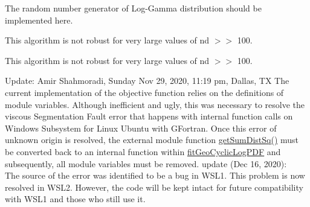 
\begin{DoxyRefList}
\item[Subprogram \mbox{\hyperlink{namespaceDistUniLogGamma__mod_acc6e60c6fa66c784f1f801eb419ecbff}{Dist\+Uni\+Log\+Gamma\+\_\+mod\+::rand}} (self)]\label{todo__todo000001}%
%
 The random number generator of Log-\/\+Gamma distribution should be implemented here.  
\item[Subprogram \mbox{\hyperlink{namespaceDomainEllipsoid__mod_a72fca483051eb7635ac24fd51f5baf25}{Domain\+Ellipsoid\+\_\+mod\+::get\+Rand\+Unit\+Radius\+MVU}} (nd)]\label{todo__todo000003}%
%
 This algorithm is not robust for very large values of {\ttfamily nd \texorpdfstring{$>$}{>}\texorpdfstring{$>$}{>} 100}. 
\item[Subprogram \mbox{\hyperlink{namespaceDomainEllipsoid__mod_a8b144d1013f139e56669c1797a7421db}{Domain\+Ellipsoid\+\_\+mod\+::get\+Rand\+Unit\+Volume\+MVU}} (nd, log\+Vol\+Unit\+Ball)]\label{todo__todo000002}%
%
 This algorithm is not robust for very large values of {\ttfamily nd \texorpdfstring{$>$}{>}\texorpdfstring{$>$}{>} 100}. 
\item[Subprogram \mbox{\hyperlink{namespaceFitGeoCyclic__mod_a1c31498edcd69664be787f9942aaecea}{Fit\+Geo\+Cyclic\+\_\+mod\+::fit\+Geo\+Cyclic\+Log\+PDF}} (max\+Num\+Trial, num\+Trial, Success\+Step, Log\+Count)]\label{todo__todo000004}%
%
 Update\+: Amir Shahmoradi, Sunday Nov 29, 2020, 11\+:19 pm, Dallas, TX The current implementation of the objective function relies on the definitions of module variables. Although inefficient and ugly, this was necessary to resolve the viscous Segmentation Fault error that happens with internal function calls on Windows Subsystem for Linux Ubuntu with GFortran. Once this error of unknown origin is resolved, the external module function {\ttfamily \mbox{\hyperlink{FitGeoCyclic__mod_8f90_aaf19ced31038d8a6fb7c3582c05a054b}{get\+Sum\+Dist\+Sq()}}} must be converted back to an internal function within \mbox{\hyperlink{namespaceFitGeoCyclic__mod_a1c31498edcd69664be787f9942aaecea}{fit\+Geo\+Cyclic\+Log\+PDF}} and subsequently, all module variables must be removed. update (Dec 16, 2020)\+: ~\newline
 The source of the error was identified to be a bug in WSL1. This problem is now resolved in WSL2. However, the code will be kept intact for future compatibility with WSL1 and those who still use it. 
\item[Subprogram \mbox{\hyperlink{namespaceHistogram__mod_ad80a9c34cbdd54d1c6b5d652c4def668}{Histogram\+\_\+mod\+::get\+Bin}} (x, lower\+Bound, nbin, binsize)]\label{todo__todo000005}%

\end{DoxyRefList}
